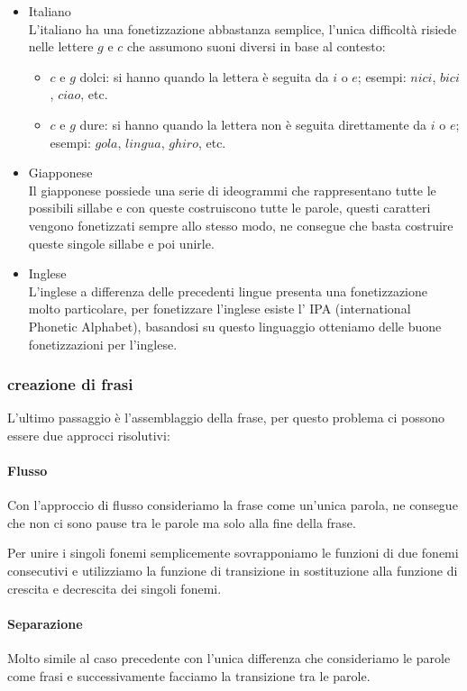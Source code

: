 \documentclass{article}
\begin{document}
\begin{itemize}
	\item Italiano \\
    	L'italiano ha una fonetizzazione abbastanza semplice, l'unica difficoltà risiede nelle lettere $g$ e $c$ che assumono suoni diversi in base al contesto:
    	\begin{itemize}
        	\item $c$ e $g$ dolci: si hanno quando la lettera è seguita da $i$ o $e$; esempi: $nici$, $bici$, $ciao$, etc.
        	\item $c$ e $g$ dure: si hanno quando la lettera non è seguita direttamente da $i$ o $e$; esempi: $gola$, $lingua$, $ghiro$, etc.
    	\end{itemize}
	\item Giapponese \\
    	Il giapponese possiede una serie di ideogrammi che rappresentano tutte le possibili sillabe e con queste costruiscono tutte le parole, questi caratteri vengono fonetizzati sempre allo stesso modo, ne consegue che basta costruire queste singole sillabe e poi unirle.
	\item Inglese \\
    	L'inglese a differenza delle precedenti lingue presenta una fonetizzazione molto particolare, per fonetizzare l'inglese esiste l' IPA (international Phonetic Alphabet), basandosi su questo linguaggio otteniamo delle buone fonetizzazioni per l'inglese.
\end{itemize}

\subsubsection{creazione di frasi}
L'ultimo passaggio è l'assemblaggio della frase, per questo problema ci possono essere due approcci risolutivi:

\paragraph{Flusso}
Con l'approccio di flusso consideriamo la frase come un'unica parola, ne consegue che non ci sono pause tra le parole ma solo alla fine della frase.

Per unire i singoli fonemi semplicemente sovrapponiamo le funzioni di due fonemi consecutivi e utilizziamo la funzione di transizione in sostituzione alla funzione di crescita e decrescita dei singoli fonemi.

\paragraph{Separazione}
Molto simile al caso precedente con l'unica differenza che consideriamo le parole come frasi e successivamente facciamo la transizione tra le parole.
\end{document}
